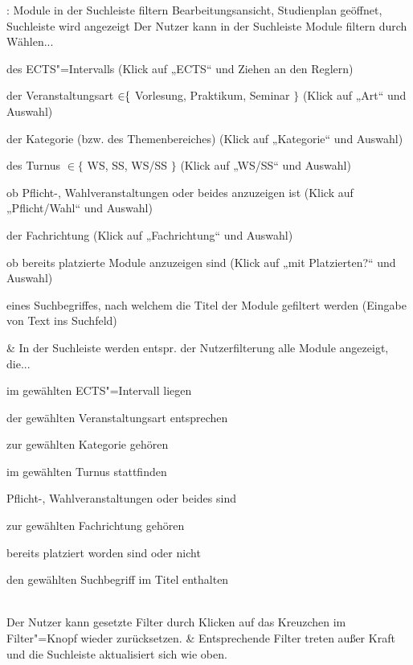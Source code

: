 \begin{usecase}{: Module in der Suchleiste filtern}
	{Bearbeitungsansicht, Studienplan geöffnet, Suchleiste wird angezeigt}
	Der Nutzer kann in der Suchleiste Module filtern durch Wählen...
	\begin{tblitemize}
		\item des ECTS"=Intervalls (Klick auf „ECTS“ und Ziehen an den Reglern)
		\item der Veranstaltungsart $\in\hspace{-3pt}\{$ Vorlesung, Praktikum, Seminar $\}$ (Klick auf „Art“ und Auswahl)
		\item der Kategorie (bzw. des Themenbereiches) (Klick auf „Kategorie“ und Auswahl)
		\item des Turnus $\in \{$ WS, SS, WS/SS $\}$ (Klick auf „WS/SS“ und Auswahl)
		\item ob Pflicht-, Wahlveranstaltungen oder beides anzuzeigen ist (Klick auf „Pflicht/Wahl“ und Auswahl)
		\item der Fachrichtung (Klick auf „Fachrichtung“ und Auswahl)
		\item ob bereits platzierte Module anzuzeigen sind (Klick auf „mit Platzierten?“ und Auswahl)
		\item eines Suchbegriffes, nach welchem die Titel der Module gefiltert werden (Eingabe von Text ins Suchfeld)
	\end{tblitemize}
	& In der Suchleiste werden entspr. der Nutzerfilterung alle Module angezeigt, die...
	\begin{tblitemize}
		\item im gewählten ECTS"=Intervall liegen
		\item der gewählten Veranstaltungsart entsprechen
		\item zur gewählten Kategorie gehören
		\item im gewählten Turnus stattfinden
		\item Pflicht-, Wahlveranstaltungen oder beides sind
		\item zur gewählten Fachrichtung gehören
		\item bereits platziert worden sind oder nicht
		\item den gewählten Suchbegriff im Titel enthalten
	\end{tblitemize} \\
	\hline
	Der Nutzer kann gesetzte Filter durch Klicken auf das Kreuzchen im Filter"=Knopf wieder zurücksetzen.
	& Entsprechende Filter treten außer Kraft und die Suchleiste aktualisiert sich wie oben.
\end{usecase}

